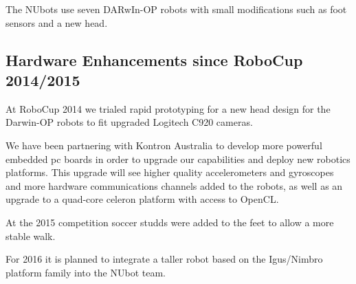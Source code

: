 \documentclass{llncs}
\begin{document}
The NUbots use seven DARwIn-OP robots with small modifications such as foot sensors and a new head. 


\subsection{Hardware Enhancements since RoboCup 2014/2015}
At RoboCup 2014 we trialed rapid prototyping for a new head design for the Darwin-OP robots to fit upgraded Logitech C920 cameras. %

We have been partnering with Kontron Australia to develop more powerful embedded pc boards in order to upgrade our capabilities and deploy new robotics platforms. This upgrade will see higher quality accelerometers and gyroscopes and more hardware communications channels added to the robots, as well as an upgrade to a quad-core celeron platform with access to OpenCL.

At the 2015 competition soccer studds were added to the feet to allow a more stable walk.

For 2016 it is planned to integrate a taller robot based on the Igus/Nimbro platform family into the NUbot team.

\end{document}

